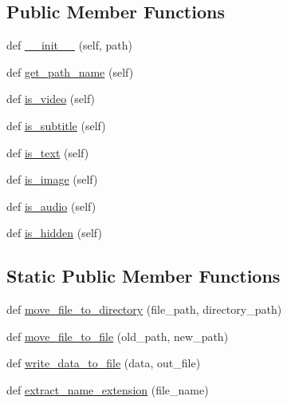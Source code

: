 \subsection*{Public Member Functions}
\begin{DoxyCompactItemize}
\item 
def \hyperlink{classhal_1_1files_1_1models_1_1_document_a2080309a793ba5fe60aa26fcaf3c0bbd}{\+\_\+\+\_\+init\+\_\+\+\_\+} (self, path)
\item 
def \hyperlink{classhal_1_1files_1_1models_1_1_document_a157a403918f676d1bdaaa58177cafca2}{get\+\_\+path\+\_\+name} (self)
\item 
def \hyperlink{classhal_1_1files_1_1models_1_1_document_a6666175408a32f5a1cf700e0e0315c15}{is\+\_\+video} (self)
\item 
def \hyperlink{classhal_1_1files_1_1models_1_1_document_a6ec8b0654bc6ff54b82f3bacad4ceb1b}{is\+\_\+subtitle} (self)
\item 
def \hyperlink{classhal_1_1files_1_1models_1_1_document_aecb93cd7bde7e21fef16c50538451815}{is\+\_\+text} (self)
\item 
def \hyperlink{classhal_1_1files_1_1models_1_1_document_a56f51ccb5598448441cd681b95540ce5}{is\+\_\+image} (self)
\item 
def \hyperlink{classhal_1_1files_1_1models_1_1_document_ab9c88190355f8602dd4fcdb3f66d5c71}{is\+\_\+audio} (self)
\item 
def \hyperlink{classhal_1_1files_1_1models_1_1_document_acb08b90372387db6c0047f8f0e4aa23b}{is\+\_\+hidden} (self)
\end{DoxyCompactItemize}
\subsection*{Static Public Member Functions}
\begin{DoxyCompactItemize}
\item 
def \hyperlink{classhal_1_1files_1_1models_1_1_document_a667fad984369339c6c03f21a91394f54}{move\+\_\+file\+\_\+to\+\_\+directory} (file\+\_\+path, directory\+\_\+path)
\item 
def \hyperlink{classhal_1_1files_1_1models_1_1_document_ae1d5c82d81497dcea679f77bdbc84387}{move\+\_\+file\+\_\+to\+\_\+file} (old\+\_\+path, new\+\_\+path)
\item 
def \hyperlink{classhal_1_1files_1_1models_1_1_document_a7e506ca64800b613848c58338eecd077}{write\+\_\+data\+\_\+to\+\_\+file} (data, out\+\_\+file)
\item 
def \hyperlink{classhal_1_1files_1_1models_1_1_document_ade6b922c91273016659c2698031fc35e}{extract\+\_\+name\+\_\+extension} (file\+\_\+name)
\end{DoxyCompactItemize}
